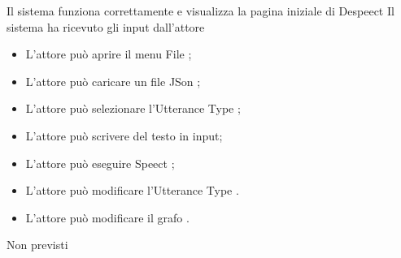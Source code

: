 \documentclass[../AnalisideiRequisiti.tex]{subfiles}
\begin{document}
	{Il sistema funziona correttamente e visualizza la pagina iniziale di Despeect}
	{Il sistema ha ricevuto gli input dall'attore}
	{\begin{itemize}
			\item{} L'attore può aprire il menu File ;
			\item{} L'attore può caricare un file JSon ;
			\item{} L'attore può selezionare l'Utterance Type ;
			\item{} L'attore può scrivere del testo in input;
			\item{} L'attore può eseguire Speect ;
			\item{} L'attore può modificare l'Utterance Type .
			\item{} L'attore può modificare il grafo .
	\end{itemize}}
	{Non previsti}
	
	
\end{document}

